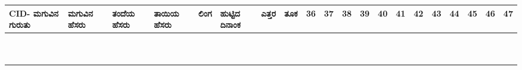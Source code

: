 ﻿\documentclass[12pt]{article}
\newcommand{\kn}[1]{%
{\fontspec[Script=Kannada]{Kedage}%
#1
}}
\begin{document}
\begin{tabular}{|p{2cm}|p{3cm}|p{2.8cm}|p{2.8cm}|p{1cm}|p{1cm}|l|l|l|l|l|l|l|l|l|l|l|l|l|l|}
CID-\kn{ಮಗುವಿನ ಗುರುತು} & \kn{ಮಗುವಿನ ಹೆಸರು} & \kn{ತಂದೆಯ ಹೆಸರು} & \kn{ತಾಯಿಯ ಹೆಸರು} & \kn{ಲಿಂಗ} & \kn{ಹುಟ್ಟಿದ ದಿನಾಂಕ} & \kn{ಎತ್ತರ} & \kn{ತೂಕ} & 36 & 37 & 38 & 39 & 40 & 41 & 42 & 43 & 44 & 45 & 46 & 47 \\ \hline
& & & & & & & &  & & & & & & & & & & & \\ \hline
& & & & & & & &  & & & & & & & & & & & \\ \hline
& & & & & & & &  & & & & & & & & & & & \\ \hline
& & & & & & & &  & & & & & & & & & & & \\ \hline
& & & & & & & &  & & & & & & & & & & & \\ \hline
& & & & & & & &  & & & & & & & & & & & \\ \hline
& & & & & & & &  & & & & & & & & & & & \\ \hline
& & & & & & & &  & & & & & & & & & & & \\ \hline
& & & & & & & &  & & & & & & & & & & & \\ \hline
& & & & & & & &  & & & & & & & & & & & \\ \hline

\end{tabular}

\pagebreak

\end{document}

